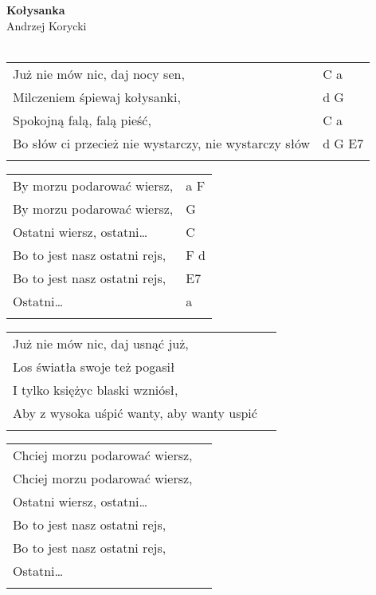 \documentclass[a5paper]{article}
\begin{document}


\noindent
\fontsize{12pt}{15pt}\selectfont
\textbf{Kołysanka} \\
\fontsize{8pt}{10pt}\selectfont
Andrzej Korycki \\ \\
\fontsize{10pt}{12pt}\selectfont
{}
\begin{tabular}{@{}p{9.00cm}p{3cm}@{}}
\noindent
Już nie mów nic, daj nocy sen, & C a \\
Milczeniem śpiewaj kołysanki, & d G \\
Spokojną falą, falą pieść, & C a \\
Bo słów ci przecież nie wystarczy, nie wystarczy słów & d G E7 \\ \\
\end{tabular}

\noindent
\begin{tabular}{@{}p{8.00cm}p{3cm}@{}}
	By morzu podarować wiersz, & a F \\
	By morzu podarować wiersz, & G \\
	Ostatni wiersz, ostatni… & C \\
	Bo to jest nasz ostatni rejs, & F d \\
	Bo to jest nasz ostatni rejs, & E7 \\
	Ostatni… & a \\ \\
\end{tabular}

\noindent
\begin{tabular}{@{}p{8.00cm}p{3cm}@{}}
Już nie mów nic, daj usnąć już,	\\
Los światła swoje też pogasił \\
I tylko księżyc blaski wzniósł,	\\
Aby z wysoka uśpić wanty, aby wanty uspić \\ \\
\end{tabular}

\noindent
\begin{tabular}{@{}p{8.00cm}p{3cm}@{}}
Chciej morzu podarować wiersz, \\
Chciej morzu podarować wiersz, \\
Ostatni wiersz, ostatni… \\
Bo to jest nasz ostatni rejs, \\
Bo to jest nasz ostatni rejs, \\
Ostatni… \\ \\
\end{tabular}
\end{document}
